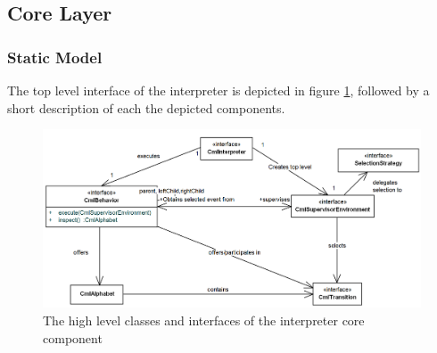 \documentclass[a4paper, 10pt]{include/compassreport}   %
\begin{document}
\subsection{Core Layer}

\subsubsection{Static Model}
\label{sec:static_structure}
The top level interface of the interpreter is depicted in figure
\ref{fig:interpreter_topLevelStructure}, followed by a short
description of each the depicted components.
\begin{figure}[ht!]
  \begin{center}
    \includegraphics[width=1\textwidth]{figures/toplevelStructure}
    \caption{The high level classes and interfaces of the interpreter core component}
    \label{fig:interpreter_topLevelStructure}
  \end{center}
\end{figure}
\end{document}
